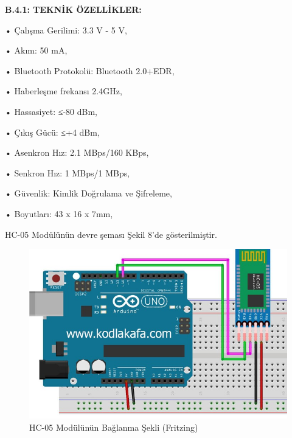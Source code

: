\textbf{B.4.1: TEKNİK ÖZELLİKLER:}
\label{CH:AltBolum7.1}

•	Çalışma Gerilimi: 3.3 V - 5 V,

•	Akım: 50 mA,

•	Bluetooth Protokolü: Bluetooth 2.0+EDR,

•	Haberleşme frekansı 2.4GHz,

•	Hassasiyet: ≤-80 dBm,

•	Çıkış Gücü: ≤+4 dBm,

•	Asenkron Hız: 2.1 MBps/160 KBps,

•	Senkron Hız: 1 MBps/1 MBps,

•	Güvenlik: Kimlik Doğrulama ve Şifreleme,

•	Boyutları: 43 x 16 x 7mm,

HC-05 Modülünün devre şeması Şekil 8’de gösterilmiştir.

\begin{figure}[H]
	\centering
	\includegraphics[width=120mm]{grafik/BluetoothFritzing.jpg}
    \caption{HC-05 Modülünün Bağlanma Şekli (Fritzing)}
	\label{fig:BluetoothFritzingDM}
\end{figure}

\clearpage
